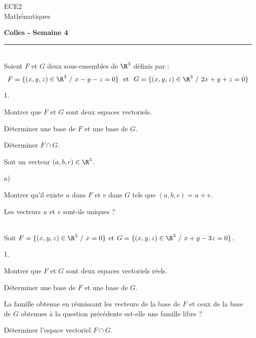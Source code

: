 \documentclass[11pt]{article}%
\begin{document}
\begin{flushleft}
ECE2 \\
Mathématiques
\end{flushleft}

\begin{center}
\textbf{\Large{Colles - Semaine 4}}
\end{center}

\hrule

\vspace*{0,2cm}


\begin{exercice}~\\
Soient $F$ et $G$ deux sous-ensembles de $\R^3$ définis par :
\[
F= \{ (x,y,z) \in \R^3 \ / \ x-y-z=0\} \ \mbox{ et } \ G=\{ (x,y,z)\in 
\R^3 \ / \ 2x+y+z=0\}
\]
\begin{noliste}{1.}
\item Montrer que $F$ et $G$ sont deux espaces vectoriels.
\item Déterminer une base de $F$ et une base de $G$.
\item Déterminer $F \cap G$.
\item Soit un vecteur $(a,b,c) \in \R^3$.
	\begin{noliste}{a)}
	\item Montrer qu'il existe $u$ dans $F$ et $v$ dans $G$ tels 
que $(a,b,c)=u+v$.
	\item Les vecteurs $u$ et $v$ sont-ils uniques ?
	\end{noliste}
\end{noliste}
\end{exercice}


\begin{exercice}~\\
Soit $F=\{(x,y,z) \in \R^3 \ / \ x=0\}$ et $G=\{(x,y,z) \in \R^3 \ / \ 
x+y-3z=0 \}$.
\begin{noliste}{1.}
\item Montrer que $F$ et $G$ sont deux espaces vectoriels réels.
\item Déterminer une base de $F$ et une base de $G$.
\item La famille obtenue en réunissant les vecteurs de la base de $F$ 
et ceux de la base de $G$ obtenues à la question précédente est-elle 
une famille libre ?
\item Déterminer l'espace vectoriel $F \cap G$.
\end{noliste}
\end{exercice}
\end{document}
